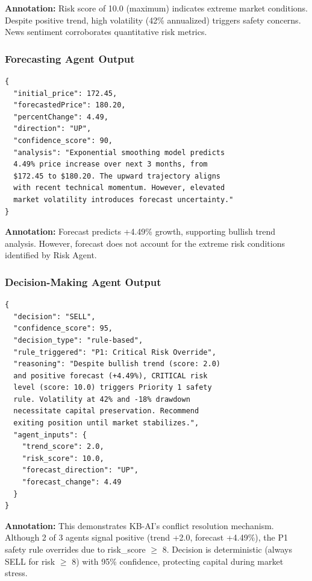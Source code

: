 \documentclass[11pt,letterpaper]{article}
\begin{document}
\textbf{Annotation:} Risk score of 10.0 (maximum) indicates extreme market conditions. Despite positive trend, high volatility (42\% annualized) triggers safety concerns. News sentiment corroborates quantitative risk metrics.

\subsubsection*{Forecasting Agent Output}

\begin{lstlisting}[caption={Forecast Agent Response}]
{
  "initial_price": 172.45,
  "forecastedPrice": 180.20,
  "percentChange": 4.49,
  "direction": "UP",
  "confidence_score": 90,
  "analysis": "Exponential smoothing model predicts 
  4.49% price increase over next 3 months, from 
  $172.45 to $180.20. The upward trajectory aligns 
  with recent technical momentum. However, elevated 
  market volatility introduces forecast uncertainty."
}
\end{lstlisting}

\textbf{Annotation:} Forecast predicts +4.49\% growth, supporting bullish trend analysis. However, forecast does not account for the extreme risk conditions identified by Risk Agent.

\subsubsection*{Decision-Making Agent Output}

\begin{lstlisting}[caption={Final Decision}]
{
  "decision": "SELL",
  "confidence_score": 95,
  "decision_type": "rule-based",
  "rule_triggered": "P1: Critical Risk Override",
  "reasoning": "Despite bullish trend (score: 2.0) 
  and positive forecast (+4.49%), CRITICAL risk 
  level (score: 10.0) triggers Priority 1 safety 
  rule. Volatility at 42% and -18% drawdown 
  necessitate capital preservation. Recommend 
  exiting position until market stabilizes.",
  "agent_inputs": {
    "trend_score": 2.0,
    "risk_score": 10.0,
    "forecast_direction": "UP",
    "forecast_change": 4.49
  }
}
\end{lstlisting}

\textbf{Annotation:} This demonstrates KB-AI's conflict resolution mechanism. Although 2 of 3 agents signal positive (trend +2.0, forecast +4.49\%), the P1 safety rule overrides due to risk\_score $\geq$ 8. Decision is deterministic (always SELL for risk $\geq$ 8) with 95\% confidence, protecting capital during market stress.
\end{document}
